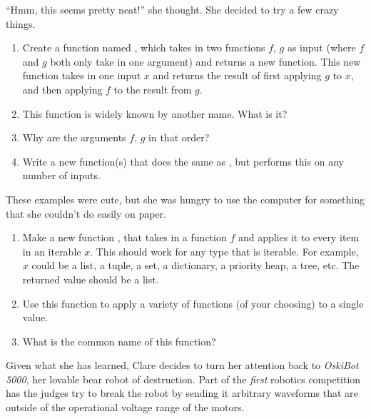 \documentclass[10pt, letterpaper, acro-macros]{python-problem}
\newcommand{\oski}{\emph{OskiBot 5000}\xspace}
\begin{document}
``Hmm, this seems pretty neat!'' she thought. She decided to try a few crazy
things.

\begin{enumerate}[resume]
  \item Create a function named , which takes in two
        functions $f$, $g$ as input (where $f$ and $g$ both only take in one
        argument) and returns a new function. This new function takes in one
        input $x$ and returns the result of first applying $g$ to $x$, and
        then applying $f$ to the result from $g$.

  \item This function is widely known by another name. What is it?


  \item Why are the arguments $f$, $g$ in that order?

  \item Write a new function(s) that does the same as , but
        performs this on any number of inputs.
\end{enumerate}

These examples were cute, but she was hungry to use the computer for
something that she couldn't do easily on paper.

\begin{enumerate}[resume]
  \item Make a new function , that takes in a function
        $f$ and applies it to every item in an iterable $x$. This should
        work for any type that is iterable. For example, $x$ could be a
        list, a tuple, a set, a dictionary, a priority heap, a tree, etc.
        The returned value should be a list.

  \item Use this function to apply a variety of functions (of your choosing)
        to a single value.

  \item What is the common name of this function?
\end{enumerate}

Given what she has learned, Clare decides to turn her attention back to
\oski, her lovable bear robot of destruction. Part of the
\emph{first} robotics competition has the judges try to break the robot by
sending it arbitrary waveforms that are outside of the operational voltage
range of the motors.
\end{document}
